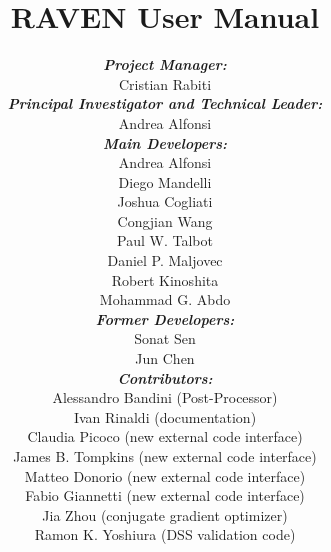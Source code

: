 \documentclass[pdf,12pt]{INLreport}
\title{RAVEN User Manual}
\author{
\textbf{\textit{Project Manager:}}
 \\Cristian Rabiti\\
 \textbf{\textit{Principal Investigator and Technical Leader:}}
 \\Andrea Alfonsi\\
\textbf{\textit{Main Developers:}}
\\Andrea Alfonsi
\\Diego Mandelli
\\Joshua Cogliati
\\Congjian Wang
\\Paul W. Talbot
\\Daniel P. Maljovec
\\Robert Kinoshita
\\Mohammad G. Abdo\\
\textbf{\textit{Former Developers:}} \\Sonat Sen
\\Jun Chen\\
\textbf{\textit{Contributors:}}
\\Alessandro Bandini (Post-Processor)
\\Ivan Rinaldi (documentation)
\\Claudia Picoco (new external code interface)
\\James B. Tompkins (new external code interface)
\\Matteo Donorio (new external code interface)
\\Fabio Giannetti (new external code interface)
\\Jia Zhou (conjugate gradient optimizer)
\\Ramon K. Yoshiura (DSS validation code)
}
\date{}
\begin{document}
    \sloppy
    \maketitle

%    







    \cleardoublepage		%
    \tableofcontents




\end{document}
